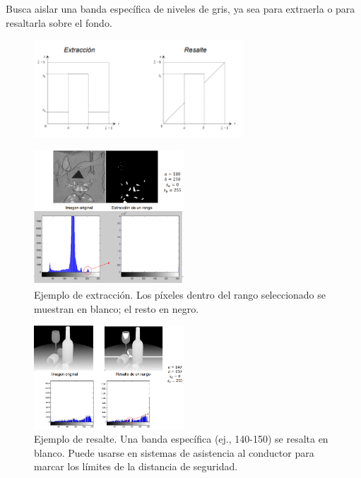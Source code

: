 \begin{itemize}
Busca aislar una banda específica de niveles de gris, ya sea para extraerla o para resaltarla sobre el fondo.

\begin{figure}[h]
\centering
\includegraphics[width = 0.7\textwidth]{figs/extraccion-resalte.png}
\end{figure}

\begin{figure}[h]
\centering
\includegraphics[width = 0.5\textwidth]{figs/extraccion-ej.png}
\caption{Ejemplo de extracción. Los píxeles dentro del rango seleccionado se muestran en blanco; el resto en negro.}
\end{figure}

\begin{figure}[h]
\centering
\includegraphics[width = 0.5\textwidth]{figs/resalte-ej.png}
\caption{Ejemplo de resalte. Una banda específica (ej., 140-150) se resalta en blanco. Puede usarse en sistemas de asistencia al conductor para marcar los límites de la distancia de seguridad.}
\end{figure} 
\end{itemize}

